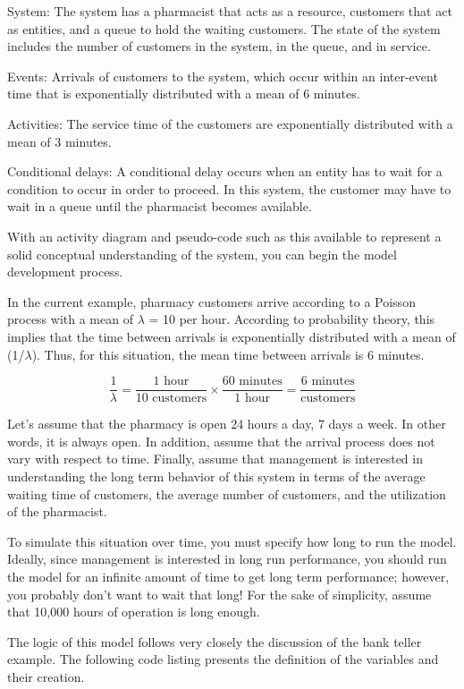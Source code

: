 \documentclass[
]{book}
\theoremstyle{definition}
\theoremstyle{definition}
\theoremstyle{definition}
\theoremstyle{definition}
\theoremstyle{remark}
\begin{document}
System: The system has a pharmacist that acts as a resource, customers that
act as entities, and a queue to hold the waiting customers. The
state of the system includes the number of customers in the system,
in the queue, and in service.

Events: Arrivals of customers to the system, which occur within an
inter-event time that is exponentially distributed with a mean of 6
minutes.

Activities: The service time of the customers are exponentially distributed with
a mean of 3 minutes.

Conditional delays: A conditional delay occurs when an entity has to wait for a
condition to occur in order to proceed. In this system, the customer
may have to wait in a queue until the pharmacist becomes available.

With an activity diagram and pseudo-code such as this available to
represent a solid conceptual understanding of the system, you can begin
the model development process.

In the current example, pharmacy customers arrive according to a Poisson
process with a mean of \(\lambda\) = 10 per hour. According to probability
theory, this implies that the time between arrivals is exponentially
distributed with a mean of (1/\(\lambda\)). Thus, for this situation, the
mean time between arrivals is 6 minutes.

\[\frac{1}{\lambda} = \frac{\text{1 hour}}{\text{10 customers}} \times \frac{\text{60 minutes}}{\text{1 hour}} = \frac{\text{6 minutes}}{\text{customers}}\]

Let's assume that the pharmacy is open 24 hours a day, 7 days a week. In
other words, it is always open. In addition, assume that the arrival
process does not vary with respect to time. Finally, assume that
management is interested in understanding the long term behavior of this
system in terms of the average waiting time of customers, the average
number of customers, and the utilization of the pharmacist.

To simulate this situation over time, you must specify how long to run
the model. Ideally, since management is interested in long run
performance, you should run the model for an infinite amount of time to
get long term performance; however, you probably don't want to wait that
long! For the sake of simplicity, assume that 10,000 hours of operation
is long enough.

The logic of this model follows very closely the discussion of the bank
teller example. The following code listing presents the definition of the variables and their creation.
\end{document}
